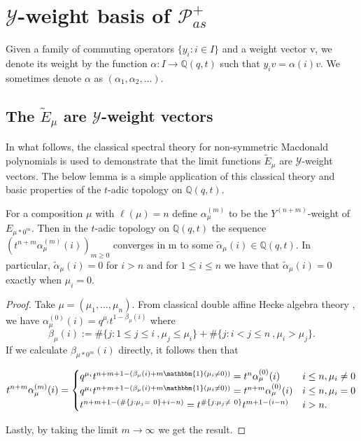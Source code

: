 \section{\texorpdfstring{$\mathscr{Y}$}{Y}-weight basis of \texorpdfstring{$\mathscr{P}_{as}^{+}$}{P\_as+}}\label{weight basis section}

Given a family of commuting operators $\{ y_i : i \in I \}$ and a weight vector v, we denote its weight by the function $\alpha: I \rightarrow \mathbb{Q}(q,t)$ such that $y_iv = \alpha(i)v.$ We sometimes denote $\alpha$ as $(\alpha_1,\alpha_2,\ldots).$

\subsection{The \texorpdfstring{$\widetilde{E}_{\mu}$}{E\_mu} are \texorpdfstring{$\mathscr{Y}$}{Y}-weight vectors}

In what follows, the classical spectral theory for non-symmetric Macdonald polynomials is used to demonstrate that the limit functions $\widetilde{E}_{\mu}$ are $\mathscr{Y}$-weight vectors. The below lemma is a simple application of this classical theory and basic properties of the $t$-adic topology on $\mathbb{Q}(q,t)$.


\begin{lemm} \label{convergence of eigenvalues}
For a composition $\mu$ with $\ell(\mu) = n$ define $\alpha_{\mu}^{(m)}$ to be the $Y^{(n+m)}$-weight of $E_{\mu *0^m}$. Then in the $t$-adic topology on $\mathbb{Q}(q,t)$ the sequence $(t^{n+m}\alpha_{\mu}^{(m)}(i))_{m\geq 0}$ converges in m to some $\widetilde{\alpha}_{\mu}(i) \in \mathbb{Q}(q,t)$. In particular, $\widetilde{\alpha}_{\mu}(i) = 0$ for $i > n$ and for $1\leq i\leq n$ we have that $\widetilde{\alpha}_{\mu}(i) = 0$  exactly when $\mu_i = 0$.
\end{lemm}


\begin{proof}
Take $\mu = (\mu_1,\ldots,\mu_n)$. From classical double affine Hecke algebra theory \cite{C_2003},  we have $\alpha_{\mu}^{(0)}(i) = q^{\mu_i}t^{1-\beta_{\mu}(i)}$ where 
\begin{equation}\label{beta defn eq}
    \beta_{\mu}(i) := \#\{j: 1\leq j \leq i ~, \mu_j \leq \mu_i\} + \#\{j: i < j \leq n ~, \mu_i > \mu_j\}.
\end{equation}
If we calculate $\beta_{\mu*0^m}(i)$ directly, it follows then that

\[ t^{n+m}\alpha_{\mu}^{(m)}(i) = 
    \begin{cases}
    q^{\mu_i}t^{n+m+1-(\beta_{\mu}(i) + m \mathbbm{1}(\mu_i \neq 0))} = t^n\alpha_{\mu}^{(0)}(i) & i\leq n, \mu_i \neq 0\\
    q^{\mu_i}t^{n+m+1-(\beta_{\mu}(i) + m \mathbbm{1}(\mu_i \neq 0))} = t^{n+m}\alpha_{\mu}^{(0)}(i) & i\leq n, \mu_i = 0 \\
    t^{n+m+1-(\#\{j:\mu_{j} = ~0\} + i-n)} = t^{\#\{j:\mu_j \neq ~0\}}t^{m+1-(i-n)} & i > n .
     \end{cases}
\]

Lastly, by taking the limit $m\rightarrow \infty$ we get the result.
\end{proof}

